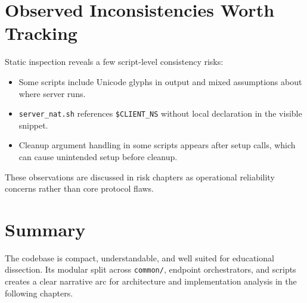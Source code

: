 \section{Observed Inconsistencies Worth Tracking}
Static inspection reveals a few script-level consistency risks:
\begin{itemize}[leftmargin=2em]
\item Some scripts include Unicode glyphs in output and mixed assumptions about where server runs.
\item \texttt{server\_nat.sh} references \texttt{\$CLIENT\_NS} without local declaration in the visible snippet.
\item Cleanup argument handling in some scripts appears after setup calls, which can cause unintended setup before cleanup.
\end{itemize}

These observations are discussed in risk chapters as operational reliability concerns rather than core protocol flaws.

\section{Summary}
The codebase is compact, understandable, and well suited for educational dissection. Its modular split across \texttt{common/}, endpoint orchestrators, and scripts creates a clear narrative arc for architecture and implementation analysis in the following chapters.
